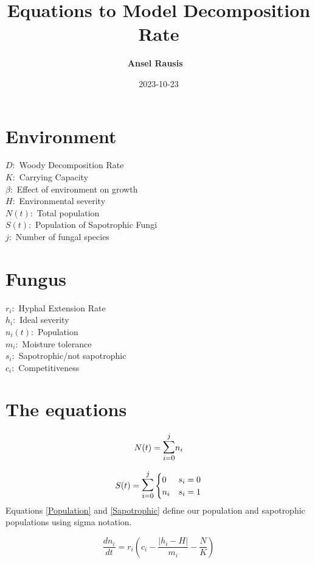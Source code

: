 \documentclass{article}
\begin{document}
\title{Equations to Model Decomposition Rate}
\author{\textbf{Ansel Rausis} \ }
\date{2023-10-23}

\noindent
\section*{Environment}
$ D: $ Woody Decomposition Rate\\
$ K: $ Carrying Capacity\\
$ \beta : $  Effect of environment on growth\\ 
$ H: $ Environmental severity\\
$ N(t): $ Total population \\
$ S(t): $ Population of Sapotrophic Fungi\\
$ j:  $ Number of fungal species

\section*{Fungus}
$ r_i: $ Hyphal Extension Rate\\
$ h_i: $ Ideal severity\\
$ n_i(t): $ Population\\
$ m_i: $ Moisture tolerance \\
$ s_i: $ Sapotrophic/not sapotrophic\\ 
$ c_i: $ Competitiveness

\section*{The equations}

\begin{equation} \label{Population}
    N(t) = \mathlarger{\mathlarger{\sum}}_{i=0}^{j} n_i
\end{equation}

\begin{equation} \label{Sapotrophic}
    S(t) = \mathlarger{\mathlarger{\sum}}_{i=0}^{j} 
    \begin{cases}
	    0 & s_i = 0\\
	    n_i & s_i = 1
    \end{cases}
\end{equation}
\noindent
Equations \ref{Population} and \ref{Sapotrophic} define our population and sapotrophic populations using sigma notation.

\begin{equation}\label{Growth rate}
    \frac{dn_i}{dt} = r_i \left(c_i - \frac{\left| h_i - H\right|}{m_i} - \frac{N}{K} \right)
\end{equation}
\end{document}
